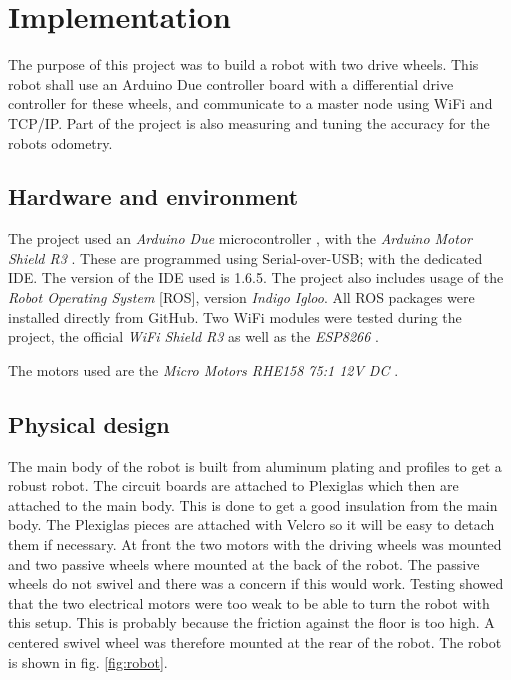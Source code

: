 \documentclass[11pt]{article}
\begin{document}
\section{Implementation}
The purpose of this project was to build a robot with two drive wheels. This
robot shall use an Arduino Due controller board with a differential drive
controller for these wheels, and communicate to a master node using WiFi and
TCP/IP. Part of the project is also measuring and tuning the accuracy for the
robots odometry.\par


\subsection{Hardware and environment}
The project used an \emph{Arduino Due} microcontroller \cite{arduinodue}, with
the \emph{Arduino Motor Shield R3} \cite{motorshield}. These are programmed
using Serial-over-USB; with the dedicated IDE. The version of the IDE used is
1.6.5. The project also includes usage of the \emph{Robot Operating System}
[ROS], version \emph{Indigo Igloo}. All ROS packages were installed directly
from GitHub. Two WiFi modules were tested during the project, the official
\emph{WiFi Shield R3} \cite{wifishield} as well as the \emph{ESP8266}
\cite{ESP8266}. \par
The motors used are the \emph{Micro Motors RHE158 75:1 12V DC} \cite{motors}.

\subsection{Physical design}
The main body of the robot is built from aluminum plating and profiles to get a
robust robot. The circuit boards are attached to Plexiglas which then are
attached to the main body. This is done to get a good insulation from the main
body. The Plexiglas pieces are attached with Velcro so it will be easy to detach
them if necessary. At front the two motors with the driving wheels was mounted
and two passive wheels where mounted at the back of the robot. The passive
wheels do not swivel and there was a concern if this would work. Testing showed
that the two electrical motors were too weak to be able to turn the robot with
this setup. This is probably because the friction against the floor is too
high. A centered swivel wheel was therefore mounted at the rear of the
robot. The robot is shown in fig. \vref{fig:robot}. \par
\end{document}
